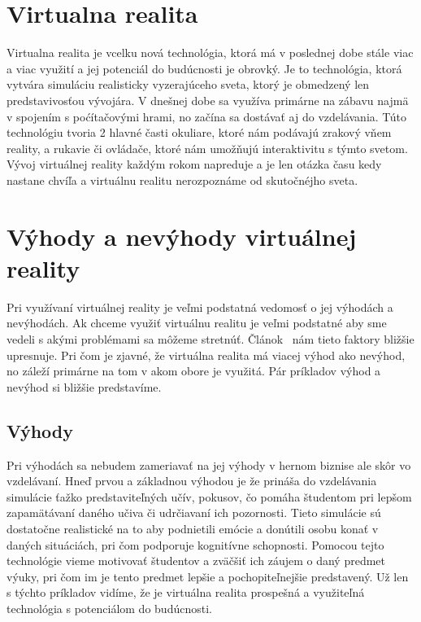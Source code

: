 \documentclass[10pt,twoside,slovak,a4paper]{article}
\begin{document}
\section{Virtualna realita} \label{realita}
Virtualna realita je vcelku nová technológia, ktorá má v poslednej dobe stále viac a viac využití a jej potenciál do budúcnosti je obrovký. Je to technológia, ktorá vytvára simuláciu realisticky vyzerajúceho sveta, ktorý je obmedzený len predstavivosťou vývojára. V dnešnej dobe sa využíva primárne na zábavu najmä v spojením s poćítačovými hrami, no začína sa dostávať aj do vzdelávania. Túto technológiu tvoria 2 hlavné časti okuliare, ktoré nám podávajú zrakový vňem reality, a rukavie či ovládače, ktoré nám umožňujú interaktivitu s týmto svetom. Vývoj virtuálnej reality každým rokom napreduje a je len otázka času kedy nastane chvíľa a virtuálnu realitu nerozpoznáme od skutočnéjho sveta.~\cite{VR}  

\section{Výhody a nevýhody virtuálnej reality} \label{procon}
Pri využívaní virtuálnej reality je veľmi podstatná vedomosť o jej výhodách a nevýhodách. Ak chceme využiť virtuálnu realitu je veľmi podstatné aby sme vedeli s akými problémami sa môžeme stretnúť. Článok~\cite{Procon} nám tieto faktory bližšie upresnuje. Pri čom je zjavné, že virtuálna realita má viacej výhod ako nevýhod, no záleží primárne na tom v akom obore je využitá. Pár príkladov výhod a nevýhod si bližšie predstavíme.    

\subsection{Výhody} \label{procon:vyhody}
Pri výhodách sa nebudem zameriavať na jej výhody v hernom biznise ale skôr vo vzdelávaní. Hneď prvou a základnou výhodou je že prináša do vzdelávania simulácie ťažko predstaviteľných učív, pokusov, čo pomáha študentom pri lepšom zapamätávaní daného učiva či udrčiavaní ich pozornosti. Tieto simulácie sú dostatočne realistické na to aby podnietili emócie a donútili osobu konať v daných situáciách, pri čom podporuje kognitívne schopnosti. Pomocou tejto technológie vieme motivovať študentov a zväčšiť ich záujem o daný predmet výuky, pri čom im je tento predmet lepšie a pochopiteľnejšie predstavený. Už len s týchto príkladov vidíme, že je virtuálna realita prospešná a využiteľná technológia s potenciálom do budúcnosti.~\cite{Procon} 
\end{document}
